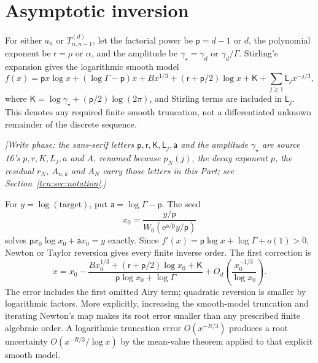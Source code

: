 \documentclass[11pt,letterpaper]{article}
\newcommand{\ee}{\mathrm e}
\theoremstyle{remark}
\begin{document}
\section{Asymptotic inversion}\label{tcn:d:sec:inversion}
For either $a_n$ or $T_{n,n-1}^{(d)}$, let the factorial power be $\mathsf p=d-1$ or $d$, the polynomial exponent be $\mathsf r=\rho$ or $\alpha$, and the amplitude be $\gamma_\star=\gamma_d$ or $\gamma_d/\Gamma$. Stirling's expansion gives the logarithmic smooth model
\begin{equation}\label{tcn:d:loginv}
 f(x)=\mathsf px\log x+(\log\Gamma-\mathsf p)x+Bx^{1/3}
 +(\mathsf r+\mathsf p/2)\log x+\mathsf K+\sum_{j\ge1}\mathsf L_jx^{-j/3},
\end{equation}
where $\mathsf K=\log\gamma_\star+(\mathsf p/2)\log(2\pi)$, and Stirling terms are included in $\mathsf L_j$. This denotes any required finite smooth truncation, not a differentiated unknown remainder of the discrete sequence.

\emph{[Write phase: the sans-serif letters $\mathsf p,\mathsf r,\mathsf K,\mathsf L_j,\mathsf a$ and the amplitude $\gamma_\star$ are source 16's $p,r,K,L_j,a$ and $A$, renamed because $p_N(j)$, the decay exponent $p$, the residual $r_N$, $A_{n,k}$ and $A_N$ carry those letters in this Part; see Section~\ref{tcn:sec:notation}.]}

For $y=\log(\text{target})$, put $\mathsf a=\log\Gamma-\mathsf p$. The seed
\begin{equation}\label{tcn:d:seed}
 x_0=\frac{y/\mathsf p}{W_0(\ee^{\mathsf a/\mathsf p}y/\mathsf p)}
\end{equation}
solves $\mathsf px_0\log x_0+\mathsf ax_0=y$ exactly. Since $f'(x)=\mathsf p\log x+\log\Gamma+o(1)>0$, Newton or Taylor reversion gives every finite inverse order. The first correction is
\begin{equation}\label{tcn:d:inverse}
 x=x_0-\frac{Bx_0^{1/3}+(\mathsf r+\mathsf p/2)\log x_0+\mathsf K}
                     {\mathsf p\log x_0+\log\Gamma}
       +O_d\left(\frac{x_0^{-1/3}}{\log x_0}\right).
\end{equation}
The error includes the first omitted Airy term; quadratic reversion is smaller by logarithmic factors. More explicitly, increasing the smooth-model truncation and iterating Newton's map makes its root error smaller than any prescribed finite algebraic order. A logarithmic truncation error $O(x^{-R/3})$ produces a root uncertainty $O(x^{-R/3}/\log x)$ by the mean-value theorem applied to that explicit smooth model.
\end{document}
